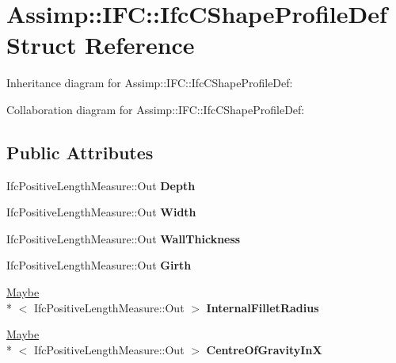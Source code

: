 \hypertarget{struct_assimp_1_1_i_f_c_1_1_ifc_c_shape_profile_def}{\section{Assimp\+:\+:I\+F\+C\+:\+:Ifc\+C\+Shape\+Profile\+Def Struct Reference}
\label{struct_assimp_1_1_i_f_c_1_1_ifc_c_shape_profile_def}
}


Inheritance diagram for Assimp\+:\+:I\+F\+C\+:\+:Ifc\+C\+Shape\+Profile\+Def\+:


Collaboration diagram for Assimp\+:\+:I\+F\+C\+:\+:Ifc\+C\+Shape\+Profile\+Def\+:
\subsection*{Public Attributes}
\begin{DoxyCompactItemize}
\item 
\hypertarget{struct_assimp_1_1_i_f_c_1_1_ifc_c_shape_profile_def_a21ad277577b07c74e3c45e5d8a62c707}{Ifc\+Positive\+Length\+Measure\+::\+Out {\bfseries Depth}}\label{struct_assimp_1_1_i_f_c_1_1_ifc_c_shape_profile_def_a21ad277577b07c74e3c45e5d8a62c707}

\item 
\hypertarget{struct_assimp_1_1_i_f_c_1_1_ifc_c_shape_profile_def_a32dfc4a1363f91b1b472061c39ab3572}{Ifc\+Positive\+Length\+Measure\+::\+Out {\bfseries Width}}\label{struct_assimp_1_1_i_f_c_1_1_ifc_c_shape_profile_def_a32dfc4a1363f91b1b472061c39ab3572}

\item 
\hypertarget{struct_assimp_1_1_i_f_c_1_1_ifc_c_shape_profile_def_a2bdc93e97160b95d5a59529ca85303d7}{Ifc\+Positive\+Length\+Measure\+::\+Out {\bfseries Wall\+Thickness}}\label{struct_assimp_1_1_i_f_c_1_1_ifc_c_shape_profile_def_a2bdc93e97160b95d5a59529ca85303d7}

\item 
\hypertarget{struct_assimp_1_1_i_f_c_1_1_ifc_c_shape_profile_def_a47246f982ec64859a639f2d81108754f}{Ifc\+Positive\+Length\+Measure\+::\+Out {\bfseries Girth}}\label{struct_assimp_1_1_i_f_c_1_1_ifc_c_shape_profile_def_a47246f982ec64859a639f2d81108754f}

\item 
\hypertarget{struct_assimp_1_1_i_f_c_1_1_ifc_c_shape_profile_def_a456bdd09daf5be5575fc25a79aad8390}{\hyperlink{struct_assimp_1_1_s_t_e_p_1_1_maybe}{Maybe}\\*
$<$ Ifc\+Positive\+Length\+Measure\+::\+Out $>$ {\bfseries Internal\+Fillet\+Radius}}\label{struct_assimp_1_1_i_f_c_1_1_ifc_c_shape_profile_def_a456bdd09daf5be5575fc25a79aad8390}

\item 
\hypertarget{struct_assimp_1_1_i_f_c_1_1_ifc_c_shape_profile_def_ad565d62df56b9c763a3f3d262d1733aa}{\hyperlink{struct_assimp_1_1_s_t_e_p_1_1_maybe}{Maybe}\\*
$<$ Ifc\+Positive\+Length\+Measure\+::\+Out $>$ {\bfseries Centre\+Of\+Gravity\+In\+X}}\label{struct_assimp_1_1_i_f_c_1_1_ifc_c_shape_profile_def_ad565d62df56b9c763a3f3d262d1733aa}

\end{DoxyCompactItemize}

